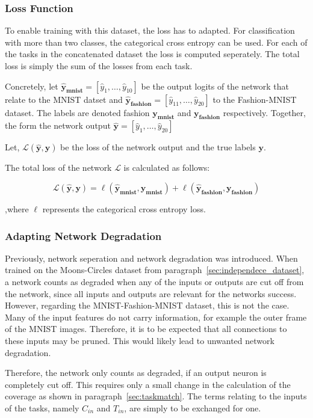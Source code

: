 \subsubsection{Loss Function}
To enable training with this dataset, the loss has to adapted.
For classification with more than two classes, the categorical cross entropy can be used.
For each of the tasks in the concatenated dataset the loss is computed seperately.
The total loss is simply the sum of the losses from each task.

Concretely, let $\mathbf{\hat y_{mnist}} = \left[\hat y_1, \dots, \hat y_{10}\right]$ be the output logits of the network that relate to the MNIST datset and $\mathbf{\hat y_{fashion}} = \left[\hat y_{11}, \dots, \hat y_{20}\right]$ to the Fashion-MNIST dataset.
The labels are denoted fashion $\mathbf{y_{mnist}}$ and $\mathbf{y_{fashion}}$ respectively.
Together, the form the network output $\mathbf{\hat y} = \left[\hat y_1, \dots, \hat y_{20}\right]$

Let, $\mathcal{L} (\mathbf{\hat y}, \mathbf{y})$ be the loss of the network output and the true labels $\mathbf{y}$.

The total loss of the network $\mathcal{L}$ is calculated as follows:

\[
\mathcal{L}  (\mathbf{\hat y}, \mathbf{y})
= \ell  (\mathbf{\hat y_{mnist}}, \mathbf{y_{mnist}})
+ \ell (\mathbf{\hat y_{fashion}}, \mathbf{y_{fashion}})
\]

,where $\ell$ represents the categorical cross entropy loss.

\subsubsection{Adapting Network Degradation}
Previously, network seperation and network degradation was introduced.
When trained on the Moons-Circles dataset from paragraph~\ref{sec:independece_dataset}, a network counts as degraded when any of the inputs or outputs are cut off from the network, since all inputs and outputs are relevant for the networks success.
However, regarding the MNIST-Fashion-MNIST dataset, this is not the case.
Many of the input features do not carry information, for example the outer frame of the MNIST images.
Therefore, it is to be expected that all connections to these inputs may be pruned.
This would likely lead to unwanted network degradation.

Therefore, the network only counts as degraded, if an output neuron is completely cut off.
This requires only a small change in the calculation of the coverage as shown in paragraph~\ref{sec:taskmatch}.
The terms relating to the inputs of the tasks, namely $C_{in}$ and $T_{in}$, are simply to be exchanged for one.